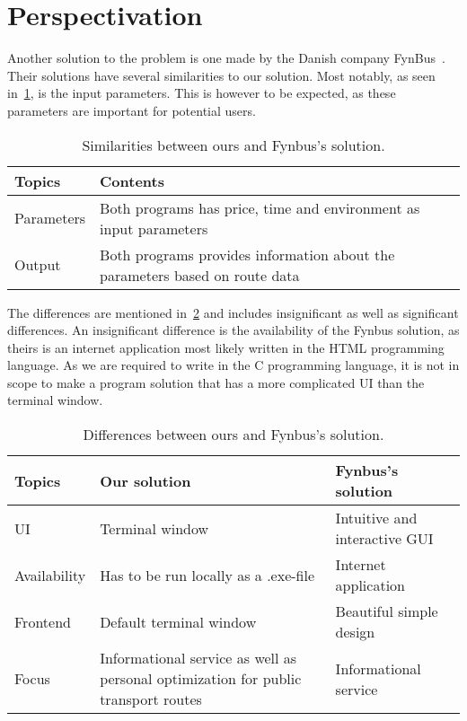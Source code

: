 \section{Perspectivation}\label{sec:perspectivation}



Another solution to the problem is one made by the Danish company FynBus~\cite{fynbus2023}.
Their solutions have several similarities to our solution.
Most notably, as seen in~\ref{tab:similarities-between-ours-and-fynbus's-solution}, is the input parameters.
This is however to be expected, as these parameters are important for potential users.

\begin{table}[ht]
    \centering
    \begin{tabular}{|l|p{5cm}|p{5cm}|}
        \hline
        \textbf{Topics} & \textbf{Contents} \\
        \hline
        Parameters & Both programs has price, time and environment as input parameters \\
        \hline
        Output & Both programs provides information about the parameters based on route data \\
        \hline
    \end{tabular}
    \caption{Similarities between ours and Fynbus's solution.}
    \label{tab:similarities-between-ours-and-fynbus's-solution}
\end{table}

The differences are mentioned in~\ref{tab:differences-between-ours-and-fynbus's-solution} and includes insignificant as
well as significant differences.
An insignificant difference is the availability of the Fynbus solution, as theirs is an internet application most
likely written in the HTML programming language.
As we are required to write in the C programming language, it is not in scope to make a program solution that has a more
complicated UI than the terminal window.

\begin{table}[ht]
    \centering
    \begin{tabular}{|l|p{5cm}|p{5cm}|}
        \hline
        \textbf{Topics} & \textbf{Our solution} & \textbf{Fynbus's solution} \\
        \hline
        UI & Terminal window & Intuitive and interactive GUI \\
        \hline
        Availability & Has to be run locally as a .exe-file & Internet application \\
        \hline
        Frontend & Default terminal window & Beautiful simple design \\
        \hline
        Focus & Informational service as well as personal optimization for public transport routes & Informational service \\
        \hline
    \end{tabular}
    \caption{Differences between ours and Fynbus's solution.}
    \label{tab:differences-between-ours-and-fynbus's-solution}
\end{table}


